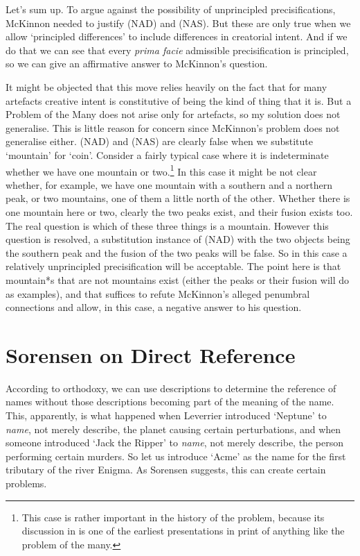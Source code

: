 Let's sum up. To argue against the possibility of unprincipled precisifications, McKinnon needed to justify (NAD) and (NAS). But these are only true when we allow `principled differences' to include differences in creatorial intent. And if we do that we can see that every \textit{prima facie} admissible precisification is principled, so we can give an affirmative answer to McKinnon's question.

It might be objected that this move relies heavily on the fact that for many artefacts creative intent is constitutive of being the kind of thing that it is. But a Problem of the Many does not arise only for artefacts, so my solution does not generalise. This is little reason for concern since McKinnon's problem does not generalise either. (NAD) and (NAS) are clearly false when we substitute `mountain' for `coin'. Consider a fairly typical case where it is indeterminate whether we have one mountain or two.\footnote{This case is rather important in the history of the problem, because its discussion in \citet{Quine1960} is one of the earliest presentations in print of anything like the problem of the many.} In this case it might be not clear whether, for example, we have one mountain with a southern and a northern peak, or two mountains, one of them a little north of the other. Whether there is one mountain here or two, clearly the two peaks exist, and their fusion exists too. The real question is which of these three things is a mountain. However this question is resolved, a substitution instance of (NAD) with the two objects being the southern peak and the fusion of the two peaks will be false. So in this case a relatively unprincipled precisification will be acceptable. The point here is that mountain*s that are not mountains exist (either the peaks or their fusion will do as examples), and that suffices to refute McKinnon's alleged penumbral connections and allow, in this case, a negative answer to his question.

\section{Sorensen on Direct Reference}

According to orthodoxy, we can use descriptions to determine the reference of names without those descriptions becoming part of the meaning of the name. This, apparently, is what happened when Leverrier introduced `Neptune' to \textit{name}, not merely describe, the planet causing certain perturbations, and when someone introduced `Jack the Ripper' to \textit{name}, not merely describe, the person performing certain murders. So let us introduce `Acme' as the name for the first tributary of the river Enigma. As Sorensen suggests, this can create certain problems.


